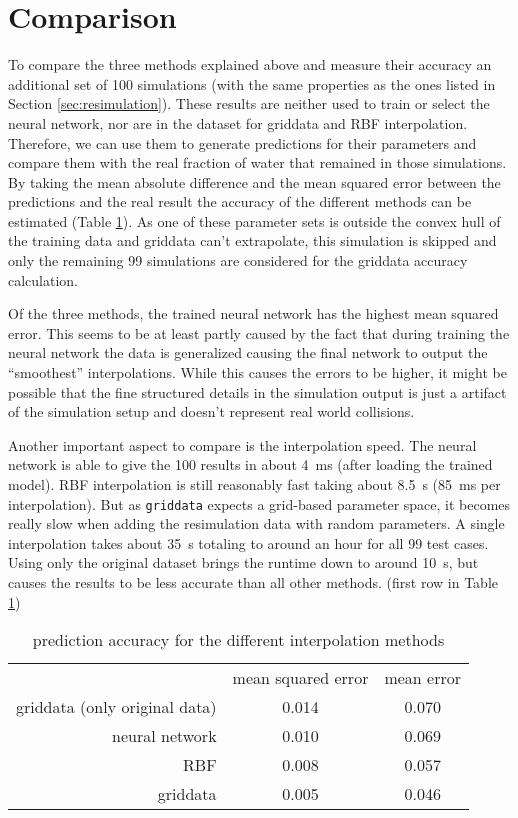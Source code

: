 \section{Comparison}
\label{sec:comparison}

To compare the three methods explained above and measure their accuracy an additional set of 100 simulations (with the same properties as the ones listed in Section \ref{sec:resimulation}). These results are neither used to train or select the neural network, nor are in the dataset for griddata and RBF interpolation. Therefore, we can use them to generate predictions for their parameters and compare them with the real fraction of water that remained in those simulations. By taking the mean absolute difference and the mean squared error between the predictions and the real result the accuracy of the different methods can be estimated (Table \ref{tab:comparison}). As one of these parameter sets is outside the convex hull of the training data and griddata can't extrapolate, this simulation is skipped and only the remaining 99 simulations are considered for the griddata accuracy calculation. 

Of the three methods, the trained neural network has the highest mean squared error. This seems to be at least partly caused by the fact that during training the neural network the data is generalized causing the final network to output the \enquote{smoothest} interpolations. While this causes the errors to be higher, it might be possible that the fine structured details in the simulation output is just a artifact of the simulation setup and doesn't represent real world collisions.

Another important aspect to compare is the interpolation speed. The neural network is able to give the 100 results in about \SI{4}{\milli\second} (after loading the trained model). RBF interpolation is still reasonably fast taking about \SI{8.5}{\second} (\SI{85}{\milli\second} per interpolation). But as \texttt{griddata} expects a grid-based parameter space, it becomes really slow when adding the resimulation data with random parameters. A single interpolation takes about \SI{35}{\second} totaling to around an hour for all 99 test cases. Using only the original dataset brings the runtime down to around \SI{10}{\second}, but causes the results to be less accurate than all other methods. (first row in Table \ref{tab:comparison})

\begin{table}
	\centering
	\begin{tabular}{rcc}
		                              & {mean squared error} & {mean error} \\
		griddata (only original data) &        0.014         &    0.070     \\
		               neural network &        0.010         &    0.069     \\
		                          RBF &        0.008         &    0.057     \\
		                     griddata &        0.005         &    0.046
	\end{tabular}
	\caption{prediction accuracy for the different interpolation methods}
	\label{tab:comparison}
\end{table}